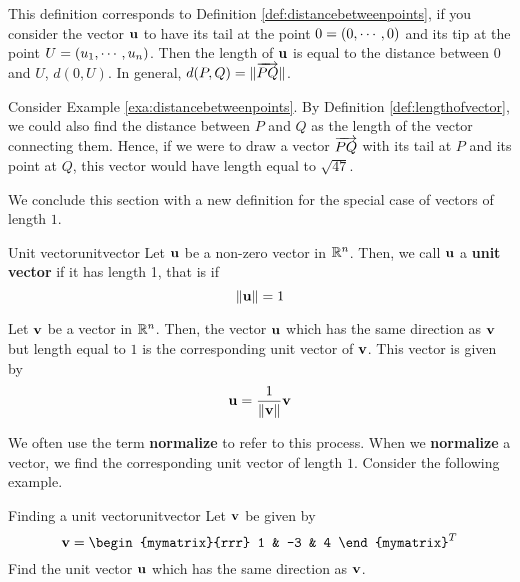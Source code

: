 This definition corresponds to Definition
\ref{def:distancebetweenpoints}, if you consider the vector ${\bf u}$
to have its tail at the point $0 = \left(0, \cdots ,0 \right)$ and its
tip at the point $U = \left(u_1, \cdots, u_n \right)$.  Then the length of
${\bf u}$ is equal to the distance between $0$ and $U$, $d(0,U)$. In general, $d(P,Q) = \| \overrightarrow{PQ} \|$. 

Consider Example \ref{exa:distancebetweenpoints}. By Definition \ref{def:lengthofvector}, we could also find the distance between $P$ and $Q$ 
as the length of the vector connecting them. Hence, if we were to draw a vector $\overrightarrow{PQ}$ 
with its tail at $P$ and its point at $Q$, this vector would have length equal to 
$\sqrt{47}$.

We conclude this section with a new definition for the special case of
vectors of length $1$.

\begin{definition}{Unit vector}{unitvector}
Let ${\bf u}$ be a non-zero vector in $\mathbb{R}^{n}$. Then, we call ${\bf u}$ a 
\textbf{unit vector} if it has length 1, that is if
\begin{equation*}
\| {\bf u} \|
=
1
\end{equation*}
\end{definition}

Let ${\bf v}$ be a vector in $\mathbb{R}^{n}$. Then, the vector ${\bf u}$
which has the same direction as ${\bf v}$ but length equal to $1$ is the corresponding unit vector of ${\bf v}$. 
This vector is given by
\begin{equation*}
{\bf u}
=
\frac{1}{\| {\bf v} \|}
{\bf v}
\end{equation*}

We often use the term \textbf{normalize} to refer to this process. When we \textbf{normalize} a vector, we find the corresponding unit vector of length $1$. 
Consider the following example.

\begin{example}{Finding a unit vector}{unitvector}
Let ${\bf v}$ be given by 
\begin{equation*}
\vect{v}
=
\begin{mymatrix}{rrr}
1 & -3 & 4
\end{mymatrix}^T
\end{equation*}
Find the unit vector ${\bf u}$ which has the same direction as ${\bf v}$.
\end{example}

